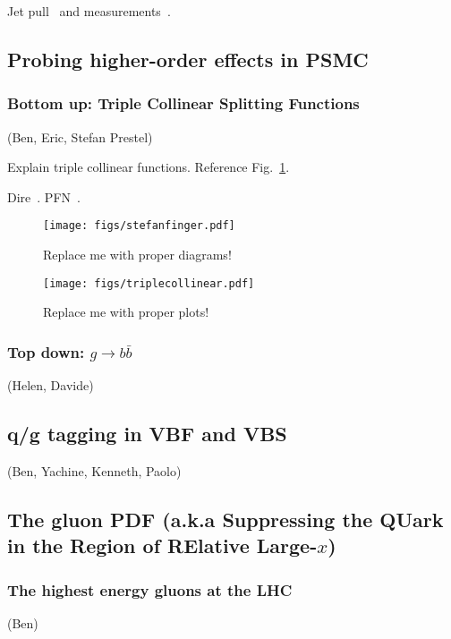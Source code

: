 \documentclass[11pt]{cernrep}
\begin{document}
Jet pull~\cite{Gallicchio:2010sw} and measurements~\cite{Aad:2015lxa,Aaboud:2018ibj}.

\subsection{Probing higher-order effects in PSMC}
\label{sec:jets:psmc}

\subsubsection{Bottom up: Triple Collinear Splitting Functions}
(Ben, Eric, Stefan Prestel)

Explain triple collinear functions.  Reference Fig.~\ref{fig:jets:np:triplecollineardiagrams}.

Dire~\cite{Hoche:2015sya}.  PFN~\cite{Komiske:2018cqr}.

\begin{figure}[h!]
\centering
\texttt{[image: figs/stefanfinger.pdf]}
\caption{Replace me with proper diagrams!}
\label{fig:jets:np:triplecollineardiagrams}
\end{figure}

\begin{figure}[h!]
\centering
\texttt{[image: figs/triplecollinear.pdf]}
\caption{Replace me with proper plots!}
\label{fig:jets:np:triplecollinearNN}
\end{figure}


\subsubsection{Top down: $g\to b \bar b$}
\label{sec:jets:gbb}
(Helen, Davide)

\subsection{q/g tagging in VBF and VBS}
\label{sec:jets:vbsbvf}
(Ben, Yachine, Kenneth, Paolo)



\subsection{The gluon PDF (a.k.a Suppressing the QUark in the Region of RElative Large-$x$)}
\label{sec:jets:pdf}



\subsubsection{The highest energy gluons at the LHC}
\label{sec:jets:highest}
(Ben)
\end{document}
